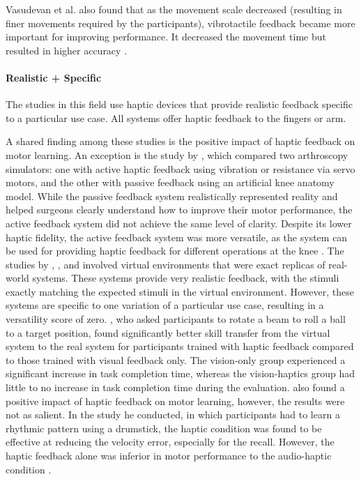 Vasudevan et al. also found that as the movement scale decreased (resulting in finer movements required by the participants), vibrotactile feedback became more important for improving performance. It decreased the movement time but resulted in higher accuracy \cite{Vasudevan2020}. 

\paragraph{Realistic + Specific} \label{sec:realisticspecific}

The studies in this field use haptic devices that provide realistic feedback specific to a particular use case. All systems offer haptic feedback to the fingers or arm.

A shared finding among these studies is the positive impact of haptic feedback on motor learning. An exception is the study by \cite{Vaghela2021}, which compared two arthroscopy simulators: one with active haptic feedback using vibration or resistance via servo motors, and the other with passive feedback using an artificial knee anatomy model. While the passive feedback system realistically represented reality and helped surgeons clearly understand how to improve their motor performance, the active feedback system did not achieve the same level of clarity. Despite its lower haptic fidelity, the active feedback system was more versatile, as the system can be used for providing haptic feedback for different operations at the knee \cite{Vaghela2021}.
The studies by \cite{Vaghela2021}, \cite{Huang2006}, and \cite{Graham2008} involved virtual environments that were exact replicas of real-world systems. These systems provide very realistic feedback, with the stimuli exactly matching the expected stimuli in the virtual environment. However, these systems are specific to one variation of a particular use case, resulting in a versatility score of zero. \cite{Huang2006}, who asked participants to rotate a beam to roll a ball to a target position, found significantly better skill transfer from the virtual system to the real system for participants trained with haptic feedback compared to those trained with visual feedback only. The vision-only group experienced a significant increase in task completion time, whereas the vision-haptics group had little to no increase in task completion time during the evaluation. \cite{Graham2008} also found a positive impact of haptic feedback on motor learning, however, the results were not as salient. In the study he conducted, in which participants had to learn a rhythmic pattern using a drumstick, the haptic condition was found to be effective at reducing the velocity error, especially for the recall. However, the haptic feedback alone was inferior in motor performance to the audio-haptic condition \cite{Graham2008}. 


